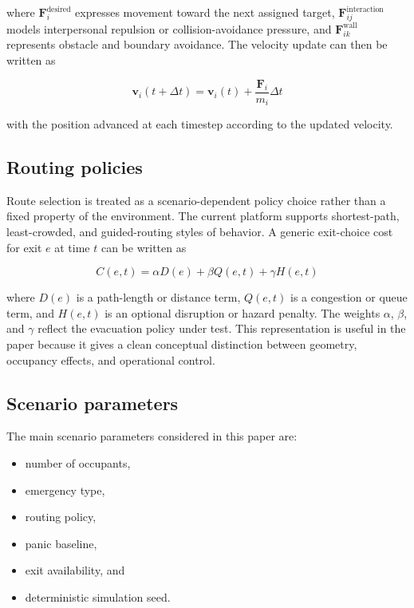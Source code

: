 \documentclass[conference]{IEEEtran}
\begin{document}
where $\mathbf{F}_i^{\text{desired}}$ expresses movement toward the next assigned target, $\mathbf{F}_{ij}^{\text{interaction}}$ models interpersonal repulsion or collision-avoidance pressure, and $\mathbf{F}_{ik}^{\text{wall}}$ represents obstacle and boundary avoidance. The velocity update can then be written as

\begin{equation}
\mathbf{v}_i(t+\Delta t) = \mathbf{v}_i(t) + \frac{\mathbf{F}_i}{m_i}\Delta t
\label{eq:velocity}
\end{equation}

with the position advanced at each timestep according to the updated velocity.

\subsection{Routing policies}

Route selection is treated as a scenario-dependent policy choice rather than a fixed property of the environment. The current platform supports shortest-path, least-crowded, and guided-routing styles of behavior. A generic exit-choice cost for exit $e$ at time $t$ can be written as

\begin{equation}
C(e,t) = \alpha D(e) + \beta Q(e,t) + \gamma H(e,t)
\label{eq:routecost}
\end{equation}

where $D(e)$ is a path-length or distance term, $Q(e,t)$ is a congestion or queue term, and $H(e,t)$ is an optional disruption or hazard penalty. The weights $\alpha$, $\beta$, and $\gamma$ reflect the evacuation policy under test. This representation is useful in the paper because it gives a clean conceptual distinction between geometry, occupancy effects, and operational control.

\subsection{Scenario parameters}
The main scenario parameters considered in this paper are:
\begin{itemize}
    \item number of occupants,
    \item emergency type,
    \item routing policy,
    \item panic baseline,
    \item exit availability, and
    \item deterministic simulation seed.
\end{itemize}
\end{document}
